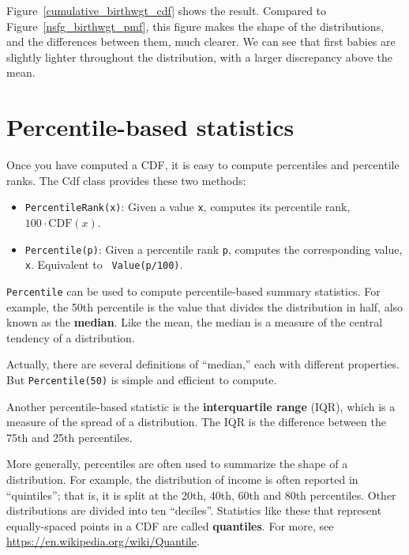 \documentclass[12pt]{book}
\newcommand{\CDF}{\mathrm{CDF}}
\theoremstyle{exercise}
\begin{document}
Figure~\ref{cumulative_birthwgt_cdf} shows the result.
Compared to Figure~\ref{nsfg_birthwgt_pmf},
this figure makes the shape of the distributions, and the differences
between them, much clearer.  We can see that first babies are slightly
lighter throughout the distribution, with a larger discrepancy above
the mean.%




\section{Percentile-based statistics}%
%
%
%
%
%
%

Once you have computed a CDF, it is easy to compute percentiles
and percentile ranks.  The Cdf class provides these two methods:%
%

\begin{itemize}

\item {\tt PercentileRank(x)}: Given a value {\tt x}, computes its
  percentile rank, $100 \cdot \CDF(x)$.

\item {\tt Percentile(p)}: Given a percentile rank {\tt p},
  computes the corresponding value, {\tt x}.  Equivalent to {\tt
    Value(p/100)}.

\end{itemize}

{\tt Percentile} can be used to compute percentile-based summary
statistics.  For example, the 50th percentile is the value that
divides the distribution in half, also known as the {\bf median}.
Like the mean, the median is a measure of the central tendency
of a distribution.

Actually, there are several definitions of ``median,'' each with
different properties.  But {\tt Percentile(50)} is simple and
efficient to compute.

Another percentile-based statistic is the {\bf interquartile range} (IQR),
which is a measure of the spread of a distribution.  The IQR
is the difference between the 75th and 25th percentiles.

More generally, percentiles are often used to summarize the shape
of a distribution.  For example, the distribution of income is
often reported in ``quintiles''; that is, it is split at the
20th, 40th, 60th and 80th percentiles.  Other distributions
are divided into ten ``deciles''.  Statistics like these that represent
equally-spaced points in a CDF are called {\bf quantiles}.
For more, see \url{https://en.wikipedia.org/wiki/Quantile}.%
%
%
\end{document}

